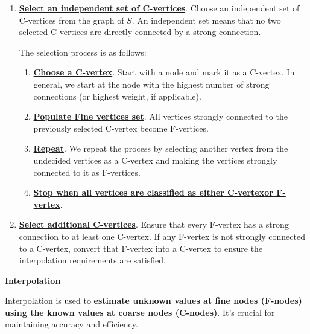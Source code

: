 \begin{enumerate}
\begin{enumerate}
    	\item \textbf{\underline{Select an independent set of C-vertices}}. Choose an independent set of C-vertices from the graph of $S$. An independent set means that no two selected C-vertices are directly connected by a strong connection.
    	
    	The selection process is as follows:
    	\begin{enumerate}
    		\item \textbf{\underline{Choose a C-vertex}}. Start with a node and mark it as a C-vertex. In general, we start at the node with the highest number of strong connections (or highest weight, if applicable).
    		\item \textbf{\underline{Populate Fine vertices set}}. All vertices strongly connected to the previously selected C-vertex become F-vertices.
    		\item \textbf{\underline{Repeat}}. We repeat the process by selecting another vertex from the undecided vertices as a C-vertex and making the vertices strongly connected to it as F-vertices.
    		\item \textbf{\underline{Stop when all vertices are classified as either C-vertex}}\break \textbf{\underline{or F-vertex}}.
    	\end{enumerate}
    	
    	\item \textbf{\underline{Select additional C-vertices}}. Ensure that every F-vertex has a strong connection to at least one C-vertex. If any F-vertex is not strongly connected to a C-vertex, convert that F-vertex into a C-vertex to ensure the interpolation requirements are satisfied.
    \end{enumerate}
\end{enumerate}

\begin{flushleft}
	\textcolor{Red2}{ \textbf{Interpolation}}
\end{flushleft}
Interpolation is used to \textbf{estimate unknown values at fine nodes (F-nodes) using the known values at coarse nodes (C-nodes)}. It’s crucial for maintaining accuracy and efficiency.

